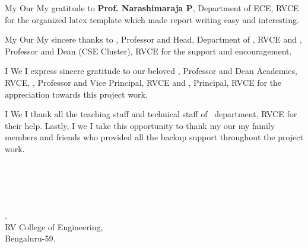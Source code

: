 \vspace{-18pt}
\ifPG My \else \ifStuNameBUsed Our \else My \fi\fi gratitude to \textbf{Prof. Narashimaraja P}, Department of ECE, RVCE for the organized latex template which made report writing easy and interesting.\\ \par
\vspace{-18pt}
\ifPG My \else \ifStuNameBUsed Our \else My \fi\fi sincere thanks to \textbf{\printHOD}, Professor and Head, Department of \ifIDP \printGuideDeptAInLF\else\printDepartmentLF\fi, RVCE and \textbf{\printDeanCS}, Professor and Dean (CSE Cluster), RVCE for the support and encouragement.\\ \par
\vspace{-18pt}
\ifPG I \else \ifStuNameBUsed We \else I \fi\fi express sincere gratitude to our beloved \textbf{\printDA}, Professor and Dean Academics, RVCE, \textbf{\printVicePrincipal}, Professor and Vice Principal, RVCE and \textbf{\printPrincipal}, Principal, RVCE for the appreciation towards this project work.\\ \par
\vspace{-18pt}
\ifIDP \else\ifPG I \else\ifStuNameBUsed We \else I \fi\fi thank all the teaching staff and technical staff of \ifIDP \printGuideDeptAInLF\else\printDepartmentLF\fi\, department, RVCE for their help. \fi Lastly, \ifPG I \else\ifStuNameBUsed we \else I \fi\fi take this opportunity to thank \ifPG my \else\ifStuNameBUsed our \else my \fi\fi family members and friends who provided all the backup support throughout the project work.\\ \par

\vspace{-18pt}
\begin{flushright}
\textbf{\printStuNameA}\\ \vspace{-3pt}
\ifStuNameBUsed \textbf{\printStuNameB}\\ \vspace{-3pt}\fi
\ifStuNameCUsed \textbf{\printStuNameC}\\ \vspace{-3pt}\fi
\ifStuNameDUsed \textbf{\printStuNameD}\\ \vspace{-3pt}\fi
\ifIDP \printGuideDeptAInLF\else\printDepartmentLF\fi, \\ \vspace{-3pt}
RV College of Engineering, \\ \vspace{-3pt}
Bengaluru-59.
\end{flushright}
